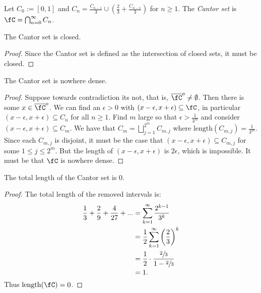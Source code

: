     \begin{definition}
        Let $C_0 := [0,1]$ and $C_n = \frac{C_{n-1}}{3} \cup \left( \frac{2}{3} + \frac{C_{n-1}}{3}\right)$ for $n \geq 1$. The \textit{Cantor set} is $\fC = \bigcap_{n = 0}^\infty C_n$.
    \end{definition}

    \begin{proposition}
        The Cantor set is closed.
    \end{proposition}
        \begin{proof}
            Since the Cantor set is defined as the intersection of closed sets, it must be closed.
        \end{proof}

    \begin{proposition}
        The Cantor set is nowhere dense.
    \end{proposition}
        \begin{proof}
            Suppose towards contradiction its not, that is, $\overline{\fC}^o \neq \emptyset$. Then there is some $x \in \overline{\fC}^o$. We can find an $\epsilon > 0$ with $(x- \epsilon, x+\epsilon) \subseteq \fC$, in particular $(x- \epsilon, x+\epsilon) \subseteq C_n$ for all $n \geq 1$. Find $m$ large so that $\epsilon > \frac{1}{3^m}$ and consider $(x-\epsilon,x+\epsilon) \subseteq C_m$. We have that $C_m = \bigsqcup_{j = 1}^{2^m}C_{m,j}$ where $\text{length}(C_{m,j}) = \frac{1}{3^m}$. Since each $C_{m,j}$ is disjoint, it must be the case that $(x-\epsilon,x+\epsilon) \subseteq C_{m,j}$ for some $1 \leq j \leq 2^m$. But the length of $(x-\epsilon,x+\epsilon)$ is $2\epsilon$, which is impossible. It must be that $\fC$ is nowhere dense.
        \end{proof}
    
    \begin{proposition}
        The total length of the Cantor set is $0$.
    \end{proposition}
        \begin{proof}
            The total length of the removed intervals is:
                \begin{equation*}
                \begin{split}
                    \frac{1}{3} + \frac{2}{9} + \frac{4}{27} + ... 
                    & = \sum_{k=1}^\infty \frac{2^{k-1}}{3^k} \\
                    & = \frac{1}{2} \sum_{k=1}^\infty \left( \frac{2}{3} \right)^k \\
                    & = \frac{1}{2} \cdot \frac{\sfrac{2}{3}}{1 - \sfrac{2}{3}} \\
                    & = 1.
                \end{split}
                \end{equation*}
            Thus $\text{length}(\fC) = 0$.
        \end{proof}

